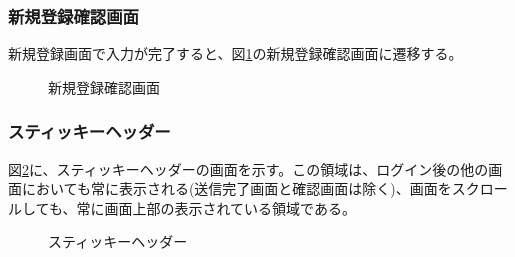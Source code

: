 \documentclass[a4j]{jarticle}
\begin{document}
\subsubsection{新規登録確認画面}
新規登録画面で入力が完了すると、図\ref{fig:subscribe_ok}の新規登録確認画面に遷移する。
\begin{figure}[H]
\centering
{}
\caption{新規登録確認画面}
\label{fig:subscribe_ok}
\end{figure}

\subsubsection{スティッキーヘッダー}
図\ref{fig:}に、スティッキーヘッダーの画面を示す。この領域は、ログイン後の他の画面においても常に表示される(送信完了画面と確認画面は除く)、画面をスクロールしても、常に画面上部の表示されている領域である。

\begin{figure}[H]
\centering
{}
\caption{スティッキーヘッダー}
\label{fig:}
\end{figure}

\begin{enumerate}
  \renewcommand{\labelenumi}{\textcircled{\scriptsize \theenumi}}\end{enumerate}
\end{document}
